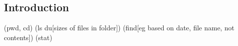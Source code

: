
\subsection{Introduction}
 
 (pwd, cd) (ls du[sizes of files in folder]) (find[eg based on date, file name, not contents]) (stat)